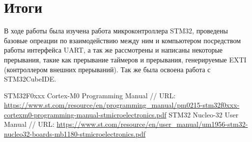 \section{Итоги}
В ходе работы была изучена работа микроконтроллера STM32, проведены базовые опреации по взаимодействию
между ним и компьютером посредством работы интерфейса UART, а так же рассмотрены и написаны некоторые прерывания,
такие как прерывание таймеров и прерывания, генерируемые EXTI (контроллером внешних прерываний). Так же 
была освоена работа с STM32CubeIDE.

\begin{thebibliography}{}
STM32F0xxx Cortex-M0 Programming Manual 
// URL: \url{https://www.st.com/resource/en/programming_manual/pm0215-stm32f0xxx-cortexm0-programming-manual-stmicroelectronics.pdf}
STM32 Nucleo-32 User Manual
// URL: \url{https://www.st.com/resource/en/user_manual/um1956-stm32-nucleo32-boards-mb1180-stmicroelectronics.pdf}
\end{thebibliography}

